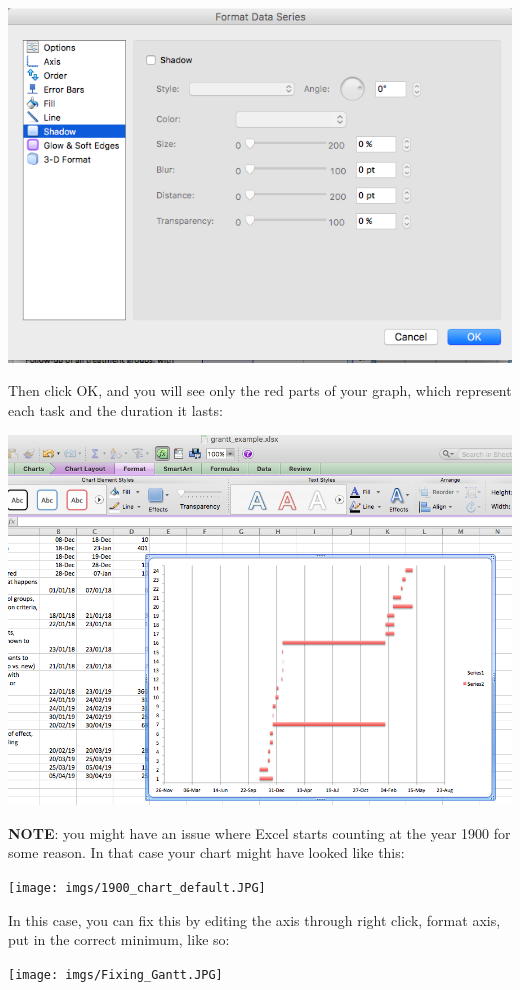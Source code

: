 \documentclass[]{book}
\theoremstyle{definition}
\theoremstyle{definition}
\theoremstyle{definition}
\theoremstyle{remark}
\begin{document}
\includegraphics{imgs/gantt_no_snadow.png}

Then click OK, and you will see only the red parts of your graph, which
represent each task and the duration it lasts:

\includegraphics{imgs/gantt_blue_cleared.png}

\textbf{NOTE}: you might have an issue where Excel starts counting at
the year 1900 for some reason. In that case your chart might have looked
like this:

\texttt{[image: imgs/1900\_chart\_default.JPG]}

In this case, you can fix this by editing the axis through right click,
format axis, put in the correct minimum, like so:

\texttt{[image: imgs/Fixing\_Gantt.JPG]}
\end{document}
